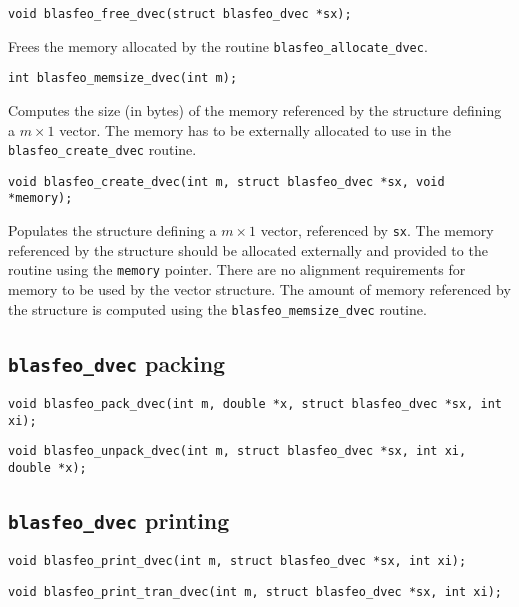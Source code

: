 \documentclass[a4paper]{report}
\begin{document}
\begin{verbatim}
void blasfeo_free_dvec(struct blasfeo_dvec *sx);
\end{verbatim}
Frees the memory allocated by the routine {\tt blasfeo\_allocate\_dvec}.

\begin{verbatim}
int blasfeo_memsize_dvec(int m);
\end{verbatim}
Computes the size (in bytes) of the memory referenced by the structure defining a $m\times 1$ vector.
The memory has to be externally allocated to use in the {\tt blasfeo\_create\_dvec} routine.

\begin{verbatim}
void blasfeo_create_dvec(int m, struct blasfeo_dvec *sx, void *memory);
\end{verbatim}
Populates the structure defining a $m\times 1$ vector, referenced by {\tt sx}.
The memory referenced by the structure should be allocated externally and provided to the routine using the {\tt memory} pointer.
There are no alignment requirements for memory to be used by the vector structure. %
The amount of memory referenced by the structure is computed using the {\tt blasfeo\_memsize\_dvec} routine.



\subsection{{\tt blasfeo\_dvec} packing}

\begin{verbatim}
void blasfeo_pack_dvec(int m, double *x, struct blasfeo_dvec *sx, int xi);
\end{verbatim}

\begin{verbatim}
void blasfeo_unpack_dvec(int m, struct blasfeo_dvec *sx, int xi, double *x);
\end{verbatim}



\subsection{{\tt blasfeo\_dvec} printing}

\begin{verbatim}
void blasfeo_print_dvec(int m, struct blasfeo_dvec *sx, int xi);
\end{verbatim}

\begin{verbatim}
void blasfeo_print_tran_dvec(int m, struct blasfeo_dvec *sx, int xi);
\end{verbatim}
\end{document}
